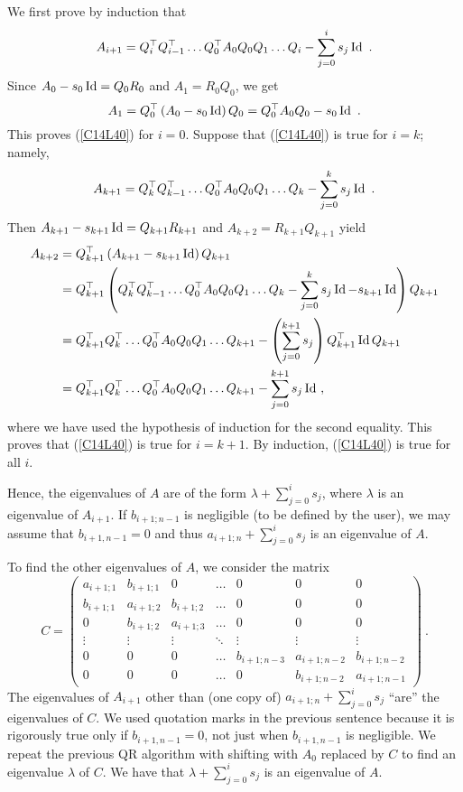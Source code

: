 We first prove by induction that
\begin{equation} \label{C14L40}
  A_{i+1} = Q_i^\top Q_{i-1}^\top \ldots Q_0^\top A_0 Q_0 Q_1 \ldots
  Q_i - \sum_{j=0}^i s_j \operatorname{Id} \ .
\end{equation}
Since $A_0 - s_0 \operatorname{Id} = Q_0R_0$ and $A_1= R_0Q_0$, we get
\[
A_1 = Q_0^\top \left(A_0 - s_0 \operatorname{Id}\right) Q_0 = Q_0^\top A_0 Q_0 -s_0 \operatorname{Id} \ .
\]
This proves (\ref{C14L40}) for $i=0$.  Suppose that (\ref{C14L40})
is true for $i=k$; namely,
\[
A_{k+1} = Q_k^\top Q_{k-1}^\top \ldots Q_0^\top A_0 Q_0 Q_1 \ldots Q_k -
\sum_{j=0}^k s_j \operatorname{Id} \ .
\]
Then $A_{k+1} - s_{k+1} \operatorname{Id} = Q_{k+1}R_{k+1}$ and $A_{k+2}= R_{k+1} Q_{k+1}$
yield
\begin{align*}
A_{k+2} &= Q_{k+1}^\top \left( A_{k+1} - s_{k+1} \operatorname{Id}\right) Q_{k+1} \\
&= Q_{k+1}^\top \left( Q_k^\top Q_{k-1}^\top \ldots Q_0^\top A_0 Q_0 Q_1
\ldots Q_k - \sum_{j=0}^k s_j \operatorname{Id} - s_{k+1} \operatorname{Id} \right) Q_{k+1} \\
&= Q_{k+1}^\top Q_k^\top \ldots Q_0^\top A_0 Q_0 Q_1 \ldots Q_{k+1} -
\left( \sum_{j=0}^{k+1} s_j \right) Q_{k+1}^\top \operatorname{Id}  Q_{k+1} \\
&= Q_{k+1}^\top Q_k^\top\ldots Q_0^\top A_0 Q_0 Q_1 \ldots Q_{k+1}
- \sum_{j=0}^{k+1} s_j \operatorname{Id} \ ,
\end{align*}
where we have used the hypothesis of induction for the second equality.
This proves that (\ref{C14L40}) is true for $i=k+1$.
By induction, (\ref{C14L40}) is true for all $i$.

Hence, the eigenvalues of $A$ are of the form
$\displaystyle \lambda + \sum_{j=0}^i s_j$, where $\lambda$ is an eigenvalue
of $A_{i+1}$.
If $b_{i+1;n-1}$ is negligible (to be defined by the user), we may assume
that $b_{i+1,n-1}=0$ and thus $\displaystyle a_{i+1;n} + \sum_{j=0}^i s_j$
is an eigenvalue of $A$.

To find the other eigenvalues of $A$, we consider the
 matrix
\[
C = \begin{pmatrix}
a_{i+1;1} & b_{i+1;1} & 0 & \ldots & 0 & 0 & 0 \\
b_{i+1;1} & a_{i+1;2} & b_{i+1;2} & \ldots & 0 & 0 & 0 \\
0 & b_{i+1;2} & a_{i+1;3} & \ldots & 0 & 0 & 0 \\
\vdots & \vdots & \vdots & \ddots & \vdots & \vdots & \vdots \\
0 & 0 & 0 & \ldots & b_{i+1;n-3} & a_{i+1;n-2} & b_{i+1;n-2} \\
0 & 0 & 0 & \ldots & 0 & b_{i+1;n-2} & a_{i+1;n-1}
\end{pmatrix} \ .
\]
The eigenvalues of $A_{i+1}$ other than (one copy of)
$\displaystyle a_{i+1;n} + \sum_{j=0}^i s_j$ ``are'' the eigenvalues
of $C$.  We used quotation marks in the previous sentence because it is
rigorously true only if $b_{i+1,n-1} = 0$, not just when $b_{i+1,n-1}$
is negligible.  We repeat the previous QR algorithm with shifting with
$A_0$ replaced by $C$ to find an eigenvalue $\lambda$ of $C$.  We have
that $\displaystyle \lambda + \sum_{j=0}^i s_j$ is an eigenvalue of $A$.

